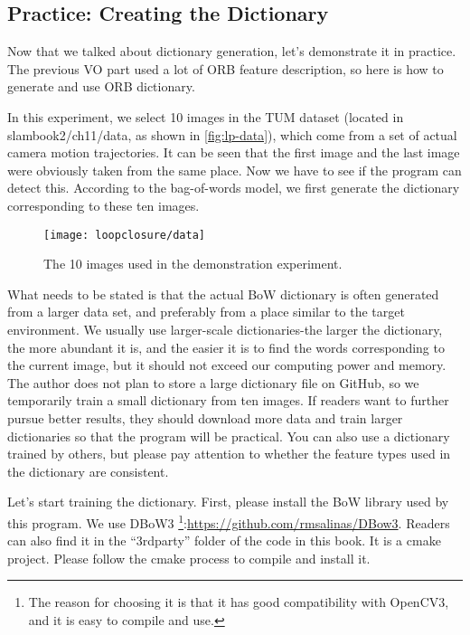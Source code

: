 \subsection{Practice: Creating the Dictionary}
Now that we talked about dictionary generation, let's demonstrate it in practice. The previous VO part used a lot of ORB feature description, so here is how to generate and use ORB dictionary.

In this experiment, we select 10 images in the TUM dataset (located in slambook2/ch11/data, as shown in \autoref{fig:lp-data}), which come from a set of actual camera motion trajectories. It can be seen that the first image and the last image were obviously taken from the same place. Now we have to see if the program can detect this. According to the bag-of-words model, we first generate the dictionary corresponding to these ten images.

\begin{figure}[!htp]
	\centering
	\texttt{[image: loopclosure/data]}
	\caption{The 10 images used in the demonstration experiment.}
	\label{fig:lp-data}
\end{figure}

What needs to be stated is that the actual BoW dictionary is often generated from a larger data set, and preferably from a place similar to the target environment. We usually use larger-scale dictionaries-the larger the dictionary, the more abundant it is, and the easier it is to find the words corresponding to the current image, but it should not exceed our computing power and memory. The author does not plan to store a large dictionary file on GitHub, so we temporarily train a small dictionary from ten images. If readers want to further pursue better results, they should download more data and train larger dictionaries so that the program will be practical. You can also use a dictionary trained by others, but please pay attention to whether the feature types used in the dictionary are consistent.

Let's start training the dictionary. First, please install the BoW library used by this program. We use DBoW3 \footnote{The reason for choosing it is that it has good compatibility with OpenCV3, and it is easy to compile and use. }:\url{https://github.com/rmsalinas/DBow3}. Readers can also find it in the ``3rdparty'' folder of the code in this book. It is a cmake project. Please follow the cmake process to compile and install it.

